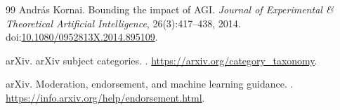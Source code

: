 \documentclass[11pt]{article}
\begin{document}
\begin{thebibliography}{99}
Andr\'as Kornai.
\newblock Bounding the impact of AGI.
\newblock \emph{Journal of Experimental \& Theoretical Artificial Intelligence},
  26(3):417--438, 2014.
\newblock doi:\href{https://doi.org/10.1080/0952813X.2014.895109}{10.1080/0952813X.2014.895109}.

arXiv.
\newblock arXiv subject categories.
.
\newblock \url{https://arxiv.org/category_taxonomy}.

arXiv.
\newblock Moderation, endorsement, and machine learning guidance.
.
\newblock \url{https://info.arxiv.org/help/endorsement.html}.

\end{thebibliography}
\end{document}
